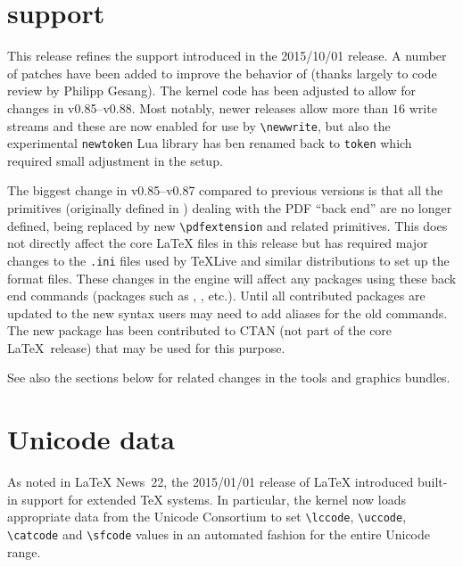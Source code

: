 \documentclass{ltnews}
\begin{document}
\maketitle

\tableofcontents

\section{ support}

This release refines the  support introduced in the
2015/10/01 release. A number of patches have been added to improve the
behavior of  (thanks largely to code review by Philipp Gesang).
The kernel code has been adjusted to
allow for changes in  v0.85--v0.88. Most notably, newer
 releases allow more than $16$ write streams and these are now
enabled for use by \verb|\newwrite|, but also the experimental
\texttt{newtoken} Lua library  has ben renamed back to \texttt{token}
which required small adjustment in the   setup.

The biggest change in   v0.85--v0.87 compared to previous
versions is that all the primitives (originally defined in
) dealing with the PDF ``back end''
are no longer defined, being replaced by new \verb|\pdfextension| and
related primitives. This does not directly affect the core \LaTeX{}
files in this release but has required major changes to the
\texttt{.ini} files used by \TeX{}Live and similar distributions to
set up the format files. These changes in the   engine
will affect any packages using these back end commands (packages such
as ,  ,   etc.).
Until all contributed packages are updated to the new syntax users may
need to add aliases for the old  commands. The new
 package has been contributed to CTAN (not part of the
core \LaTeX\ release) that may be used for this purpose. 

See also the sections below for related changes in the
\textsf{tools} and \textsf{graphics} bundles.


\section{Unicode data}

As noted in \LaTeX{} News~22, the 2015/01/01 release of \LaTeX{} introduced
built-in support for extended \TeX{} systems. In particular, the kernel now
loads appropriate data from the Unicode Consortium to set \verb|\lccode|,
\verb|\uccode|, \verb|\catcode| and \verb|\sfcode| values in an automated
fashion for the entire Unicode range.
\end{document}
